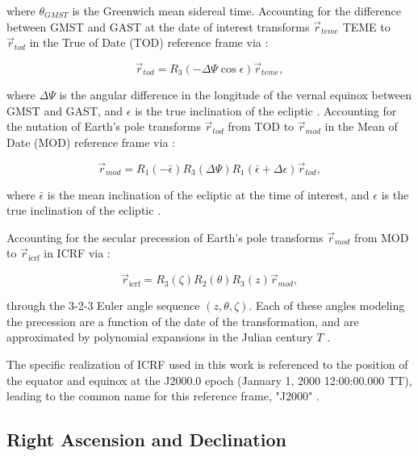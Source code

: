 where $\theta_{GMST}$ is the Greenwich mean sidereal time. Accounting for the difference between GMST and GAST at the date of interest transforms $\vec{r}_{teme}$ TEME to $\vec{r}_{tod}$ in the True of Date (TOD) reference frame via \cite{vallado4ed}:

\begin{equation} \label{eq:teme_to_tod}
  \vec{r}_{tod} = R_3(-\Delta \Psi \cos \epsilon) \vec{r}_{teme},
\end{equation}

where $\Delta \Psi$ is the angular difference in the longitude of the vernal equinox between GMST and GAST, and $\epsilon$ is the true inclination of the ecliptic \cite{vallado4ed}. Accounting for the nutation of Earth's pole transforms $\vec{r}_{tod}$ from TOD to $\vec{r}_{mod}$ in the Mean of Date (MOD) reference frame via \cite{vallado4ed}:

\begin{equation} \label{eq:tod_to_mod}
  \vec{r}_{mod} = R_1(-\bar{\epsilon}) R_3(\Delta\Psi) R_1(\bar{\epsilon} + \Delta\epsilon) \vec{r}_{tod},
\end{equation}

where $\bar{\epsilon}$ is the mean inclination of the ecliptic at the time of interest, and $\epsilon$ is the true inclination of the ecliptic \cite{vallado4ed}.

Accounting for the secular precession of Earth's pole transforms $\vec{r}_{mod}$ from MOD to $\vec{r}_\mathrm{icrf}$ in ICRF via \cite{vallado4ed}:

\begin{equation} \label{eq:mod_to_icrf}
  \vec{r}_\mathrm{icrf} = R_3(\zeta) R_2(\theta) R_3(z) \vec{r}_{mod},
\end{equation}

through the 3-2-3 Euler angle sequence $\left( z, \theta, \zeta \right)$. Each of these angles modeling the precession are a function of the date of the transformation, and are approximated by polynomial expansions in the Julian century $T$ \cite{frueh2019notes}.

The specific realization of ICRF used in this work is referenced to the position of the equator and equinox at the J2000.0 epoch (January 1, 2000 12:00:00.000 TT), leading to the common name for this reference frame, "J2000" \cite{vallado4ed}.

\subsection{Right Ascension and Declination}

